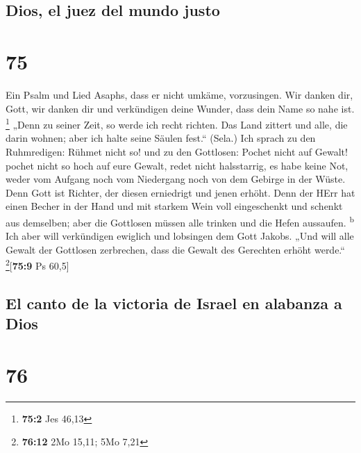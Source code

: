 \hypertarget{dios-el-juez-del-mundo-justo}{%
\subsection{Dios, el juez del mundo
justo}\label{dios-el-juez-del-mundo-justo}}

\hypertarget{section-74}{%
\section{75}\label{section-74}}

 Ein Psalm und Lied Asaphs, dass er nicht umkäme,
vorzusingen.  Wir danken dir, Gott, wir danken dir und
verkündigen deine Wunder, dass dein Name so nahe ist. \footnote{\textbf{75:2}
  Jes 46,13}  „Denn zu seiner Zeit, so werde ich recht
richten.  Das Land zittert und alle, die darin wohnen;
aber ich halte seine Säulen fest.`` (Sela.)  Ich sprach zu
den Ruhmredigen: Rühmet nicht so! und zu den Gottlosen: Pochet nicht auf
Gewalt!  pochet nicht so hoch auf eure Gewalt, redet nicht
halsstarrig,  es habe keine Not, weder vom Aufgang noch
vom Niedergang noch von dem Gebirge in der Wüste.  Denn
Gott ist Richter, der diesen erniedrigt und jenen erhöht. 
Denn der HErr hat einen Becher in der Hand und mit starkem Wein voll
eingeschenkt und schenkt aus demselben; aber die Gottlosen müssen alle
trinken und die Hefen aussaufen. \textsuperscript{b}  Ich
aber will verkündigen ewiglich und lobsingen dem Gott Jakobs.
 „Und will alle Gewalt der Gottlosen zerbrechen, dass die
Gewalt des Gerechten erhöht werde.`` \footnote{\textbf{76:12} 2Mo 15,11;
  5Mo 7,21}{[}\textbf{75:9} Ps 60,5{]}

\hypertarget{el-canto-de-la-victoria-de-israel-en-alabanza-a-dios}{%
\subsection{El canto de la victoria de Israel en alabanza a
Dios}\label{el-canto-de-la-victoria-de-israel-en-alabanza-a-dios}}

\hypertarget{section-75}{%
\section{76}\label{section-75}}

